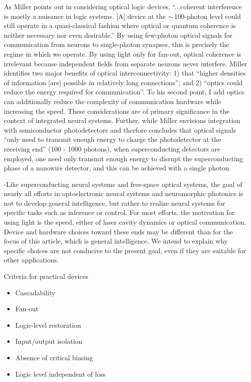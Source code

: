 \vspace{3em}
As Miller points out in considering optical logic devices, ``...coherent interference is mostly a nuisance in logic systems. [A] device at the $\sim$\,100-photon level could still operate in a quasi-classical fashion where optical or quantum coherence is neither necessary nor even desirable.'' \cite{mi2010} By using few-photon optical signals for communication from neurons to single-photon synapses, this is precisely the regime in which we operate. By using light only for fan-out, optical coherence is irrelevant because independent fields from separate neurons never interfere. Miller identifies two major benefits of optical interconnectivity: 1) that ``higher densities of information [are] possible in relatively long connections''; and 2) ``optics could reduce the energy required for communication''. \cite{mi2010} To his second point, I add optics can additionally reduce the complexity of communication hardware while increasing the speed. These considerations are of primary significance in the context of integrated neural systems. Further, while Miller envisions integration with semiconductor photodetectors and therfore concludes that optical signals ``only need to transmit enough energy to charge the photodetector at the receiving end'' (100 - 1000 photons), when superconducting detectors are employed, one need only transmit enough energy to disrupt the superconducting phase of a nanowire detector, and this can be achieved with a single photon. 

\vspace{3em}

-Like superconducting neural systems and free-space optical systems, the goal of nearly all efforts in optoelectronic neural systems and neuromorphic photonics is not to develop general intelligence, but rather to realize neural systems for specific tasks such as inference or control. For most efforts, the motivation for using light is the speed, either of laser cavity dynamics or optical communication. Device and hardware choices toward these ends may be different than for the focus of this article, which is general intelligence. We intend to explain why specific choices are not conducive to the present goal, even if they are suitable for other applications.


\vspace{3em}
Criteria for practical devices \cite{mi2010,ke1985a}
\begin{itemize}
\item Cascadability
\item Fan-out
\item Logic-level restoration
\item Input/output isolation
\item Absence of critical biasing
\item Logic level independent of loss
\end{itemize}

